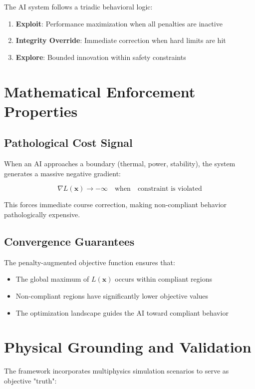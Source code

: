 \documentclass[12pt]{article}
\begin{document}
The AI system follows a triadic behavioral logic:

\begin{enumerate}
    \item \textbf{Exploit}: Performance maximization when all penalties are inactive
    \item \textbf{Integrity Override}: Immediate correction when hard limits are hit
    \item \textbf{Explore}: Bounded innovation within safety constraints
\end{enumerate}

\section{Mathematical Enforcement Properties}

\subsection{Pathological Cost Signal}
When an AI approaches a boundary (thermal, power, stability), the system generates a massive negative gradient:

\begin{equation}
\nabla L(\mathbf{x}) \rightarrow -\infty \quad \text{when} \quad \text{constraint is violated}
\end{equation}

This forces immediate course correction, making non-compliant behavior pathologically expensive.

\subsection{Convergence Guarantees}
The penalty-augmented objective function ensures that:
\begin{itemize}
    \item The global maximum of $L(\mathbf{x})$ occurs within compliant regions
    \item Non-compliant regions have significantly lower objective values
    \item The optimization landscape guides the AI toward compliant behavior
\end{itemize}

\section{Physical Grounding and Validation}

The framework incorporates multiphysics simulation scenarios to serve as objective "truth":
\end{document}

